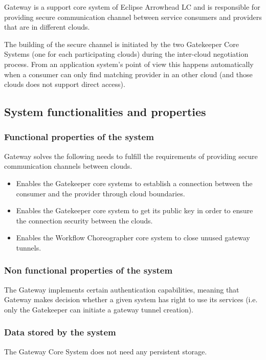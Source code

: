 \documentclass[a4paper]{arrowhead}
\begin{document}
Gateway is a support core system of Eclipse Arrowhead LC and is responsible for providing secure communication channel between service consumers and providers that are in different clouds. 

The building of the secure channel is initiated by the two Gatekeeper Core Systems (one for each participating clouds) during the inter-cloud negotiation process. From an application system's point of view this happens automatically when a consumer can only find matching provider in an other cloud (and those clouds does not support direct access).

\subsection{System functionalities and properties}
\label{sec:properties}

\subsubsection {Functional properties of the system}
Gateway solves the following needs to fulfill the requirements of providing secure communication channels between clouds.

\begin{itemize}
    \item Enables the Gatekeeper core systems to establish a connection between the consumer and the provider through cloud boundaries.
    \item Enables the Gatekeeper core system to get its public key in order to ensure the connection security between the clouds.
    \item Enables the Workflow Choreographer core system to close unused gateway tunnels.
\end{itemize}

\subsubsection {Non functional properties of the system}
The Gateway implements certain authentication capabilities, meaning that Gateway makes decision whether a given system has right to use its services (i.e. only the Gatekeeper can initiate a gateway tunnel creation).

\subsubsection {Data stored by the system}
The Gateway Core System does not need any persistent storage.
\end{document}
